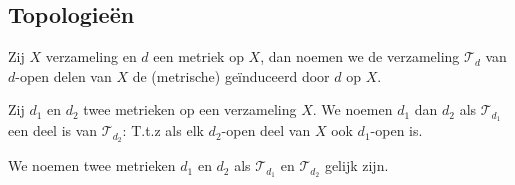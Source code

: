 \documentclass[main.tex]{subfiles}
\begin{document}
\subsection{Topologie\"en}
\label{sec:topologieen}

\begin{de}
  Zij $X$ verzameling en $d$ een metriek op $X$, dan noemen we de verzameling $\mathcal{T}_{d}$ van $d$-open delen van $X$ de (metrische)  ge\"induceerd door $d$ op $X$.
\end{de}

\begin{de}
  Zij $d_{1}$ en $d_{2}$ twee metrieken op een verzameling $X$.
  We noemen $d_{1}$  dan $d_{2}$ als $\mathcal{T}_{d_{1}}$ een deel is van $\mathcal{T}_{d_{2}}$:
  T.t.z als elk $d_{2}$-open deel van $X$ ook $d_{1}$-open is.
\end{de}


\begin{de}
  We noemen twee metrieken $d_{1}$ en $d_{2}$  als $\mathcal{T}_{d_{1}}$ en $\mathcal{T}_{d_{2}}$ gelijk zijn.
\end{de}
\end{document}
